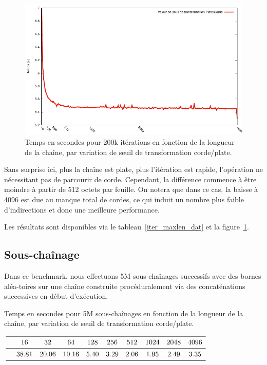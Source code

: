 \begin{figure}
	\caption{Temps en secondes pour 200k itérations en fonction de la longueur de la chaîne, par variation de seuil de transformation corde/plate.}
	\label{iter_maxlen_fig}
	\centering
	\includegraphics[]{figures/iteration_maxlen.pdf}
\end{figure}

Sans surprise ici, plus la chaîne est plate, plus l'itération est rapide, l'opération ne nécessitant pas de parcourir
de corde.
Cependant, la différence commence à être moindre à partir de 512 octets par feuille.
On notera que dans ce cas, la baisse à 4096 est due au manque total de cordes, ce qui induit un nombre plus faible d'indirections et donc une meilleure performance.

Les résultats sont disponibles via le tableau~\ref{iter_maxlen_dat} et la figure~\ref{iter_maxlen_fig}.

\subsection{Sous-chaînage}

Dans ce benchmark, nous effectuons 5M sous-chaînages successifs avec des bornes aléa-toires sur une chaîne construite
procéduralement via des concaténations successives en début d'exécution.

\begin{table}
	\caption{\label{substr_maxlen_dat}Temps en secondes pour 5M sous-chaînages en fonction de la longueur de la chaîne, par variation de seuil de transformation corde/plate.}
	\centering
	$\begin{array}{ *{10}{c} }
		\toprule
		& 16 & 32 & 64 & 128 & 256 & 512 & 1024 & 2048 & 4096\\
		\midrule
		& 38.81 & 20.06 & 10.16 & 5.40 & 3.29 & 2.06 & 1.95 & 2.49 & 3.35\\
		\bottomrule
	\end{array}$
\end{table}

